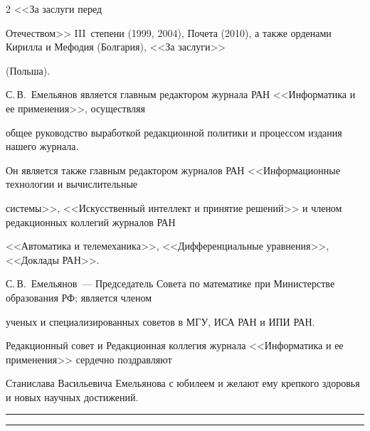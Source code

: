 \begin{multicols}{2}
<<За заслуги перед

Отечеством>> III~степени (1999, 2004), Почета (2010), а также орденами Кирилла и Мефодия (Болгария), <<За заслуги>>

(Польша).



     С.\,В.~Емельянов является главным редактором журнала РАН <<Информатика и ее применения>>, осуществляя

общее руководство выработкой редакционной политики и процессом издания нашего журнала.



     Он является также главным редактором журналов РАН <<Информационные технологии и вы\-чис\-ли\-тель\-ные

системы>>, <<Искусственный интеллект и принятие решений>> и членом редакционных коллегий журналов РАН

<<Автоматика и телемеханика>>, <<Дифференциальные уравнения>>, <<Доклады РАН>>.



     С.\,В.~Емельянов~--- Председатель Совета по математике при Министерстве образования РФ; является членом

ученых и специализированных советов в МГУ, ИСА РАН и ИПИ РАН.



     \bigskip



     Редакционный совет и Редакционная коллегия журнала <<Информатика и ее применения>> сердечно поздравляют

Станислава Васильевича Емельянова с юбилеем и желают ему крепкого здоровья и новых научных достижений.



   \thispagestyle{empty}










\end{multicols}



\hrule



\vspace*{2pt}



\hrule



\vspace*{6pt}





